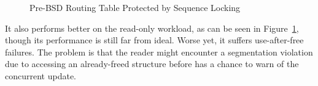 \begin{figure}[tb]
\centering
{}
\caption{Pre-BSD Routing Table Protected by Sequence Locking}
\label{fig:defer:Pre-BSD Routing Table Protected by Sequence Locking}
\end{figure}

It also performs better on the read-only workload, as can be seen in
Figure~\ref{fig:defer:Pre-BSD Routing Table Protected by Sequence Locking},
though its performance is still far from ideal.
Worse yet, it suffers use-after-free failures.
The problem is that the reader might encounter a segmentation violation
due to accessing an already-freed structure before 
has a chance to warn of the concurrent update.

